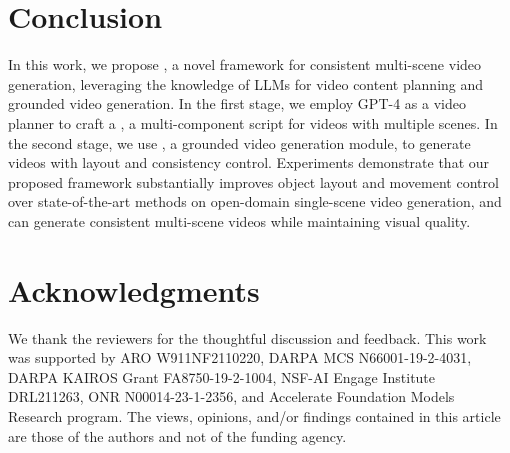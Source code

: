 \documentclass{article}
\begin{document}
\section{Conclusion}
\label{sec:conclusion}
In this work, we propose \method{}, a novel 
framework for consistent multi-scene video generation, leveraging the knowledge of LLMs for video content planning and grounded video generation.
In the first stage, we employ GPT-4 as a video planner to craft a \videoplan{}, a multi-component script for videos with multiple scenes.
In the second stage, we use \videomodule{}, a grounded video generation module, to generate videos with layout and consistency control.
Experiments demonstrate that our proposed framework
substantially improves object layout and movement control over state-of-the-art methods on open-domain single-scene video generation, and 
can generate consistent multi-scene videos while maintaining visual quality.


\section*{Acknowledgments}
We thank the reviewers for the thoughtful discussion and feedback. 
This work was supported by ARO W911NF2110220, DARPA MCS N66001-19-2-4031, DARPA KAIROS
Grant FA8750-19-2-1004, NSF-AI Engage Institute DRL211263, ONR N00014-23-1-2356, and Accelerate
Foundation Models Research program. The views, opinions, and/or findings contained in this article are
those of the authors and not of the funding agency.







\newpage


\end{document}
